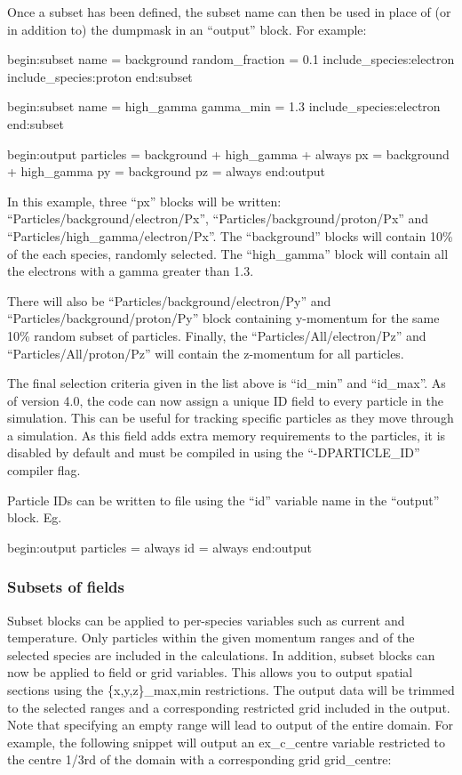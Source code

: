 Once a subset has been defined, the subset name can then be used in place of
(or in addition to) the dumpmask in an ``output'' block. For example:
{\samepage
\begin{boxverbatim}
begin:subset
   name = background
   random_fraction = 0.1
   include_species:electron
   include_species:proton
end:subset

begin:subset
   name = high_gamma
   gamma_min = 1.3
   include_species:electron
end:subset

begin:output
   particles = background + high_gamma + always
   px = background + high_gamma
   py = background
   pz = always
end:output
\end{boxverbatim}
}

In this example, three ``px'' blocks will be written:
``Particles/background/electron/Px'', ``Particles/background/proton/Px''
and ``Particles/high\_gamma/electron/Px''.
The ``background'' blocks will contain 10\% of the each species, randomly
selected.
The ``high\_gamma'' block will contain all the electrons with a gamma
greater than 1.3.

There will also be ``Particles/background/electron/Py'' and
``Particles/background/proton/Py'' block containing y-momentum for the same
10\% random subset of particles.
Finally, the ``Particles/All/electron/Pz'' and ``Particles/All/proton/Pz'' will
contain the z-momentum for all particles.

The final selection criteria given in the list above is ``id\_min'' and
``id\_max''. As of {\EPOCH} version 4.0, the code can now assign a unique
ID field to every particle in the simulation. This can be useful for
tracking specific particles as they move through a simulation. As this
field adds extra memory requirements to the particles, it is disabled by
default and must be compiled in using the ``-DPARTICLE\_ID'' compiler flag.

Particle IDs can be written to file using the ``id'' variable name in
the ``output'' block.  Eg.
\begin{boxverbatim}
begin:output
   particles = always
   id = always
end:output
\end{boxverbatim}


\subsubsection{Subsets of fields}

Subset blocks can be applied to per-species variables such as current and
temperature. Only particles within the given momentum ranges and of the selected
species are included in the calculations. In addition, subset blocks can now
be applied to field or grid variables. This allows
you to output spatial sections using the {\emphtext \{x,y,z\}\_max,min}
restrictions.
The output data will be trimmed to the selected ranges and a corresponding
restricted grid included in the output. Note that specifying an empty range
will lead to output of the entire domain. For example, the following snippet
will output an ex\_c\_centre variable restricted to the centre 1/3rd of the
domain with a corresponding grid grid\_centre:

